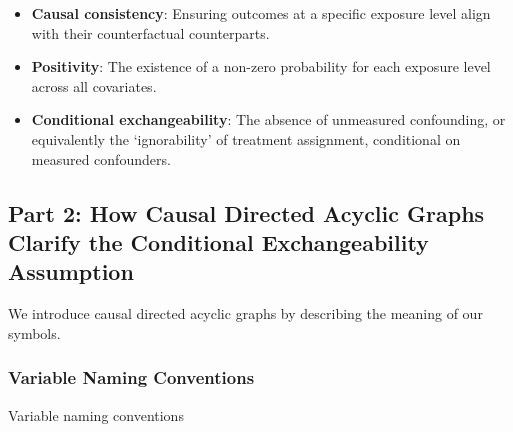 \documentclass[
  single column]{article}
\providecommand{\tightlist}{%
  \setlength{\itemsep}{0pt}\setlength{\parskip}{0pt}}\usepackage{longtable,booktabs,array}
\begin{document}
\begin{itemize}
\tightlist
\item
  \textbf{Causal consistency}: Ensuring outcomes at a specific exposure
  level align with their counterfactual counterparts.
\item
  \textbf{Positivity}: The existence of a non-zero probability for each
  exposure level across all covariates.
\item
  \textbf{Conditional exchangeability}: The absence of unmeasured
  confounding, or equivalently the `ignorability' of treatment
  assignment, conditional on measured confounders.
\end{itemize}

\newpage{}

\subsection{Part 2: How Causal Directed Acyclic Graphs Clarify the
Conditional Exchangeability Assumption}\label{id-sec-2}

We introduce causal directed acyclic graphs by describing the meaning of
our symbols.

\subsubsection{Variable Naming
Conventions}\label{variable-naming-conventions}

\begin{table}

\caption{\label{tbl-terminology}Variable naming conventions}

\centering{

\terminologylocalconventionssimple

}

\end{table}%
\end{document}
